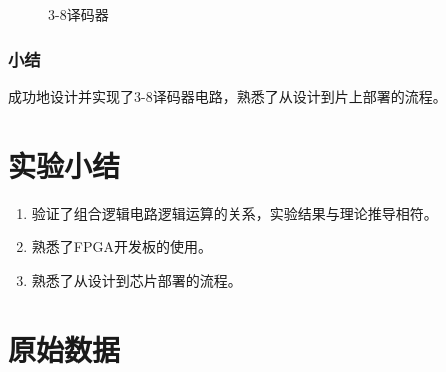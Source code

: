 \documentclass[UTF8]{ctexart}
\numberwithin{figure}{subsection}
\numberwithin{table}{subsection}
\numberwithin{equation}{subsection}
\begin{document}
\begin{figure}[H]
    
    \caption{3-8译码器}
    \label{38dec}
\end{figure}

\subsubsection{小结}
\par 成功地设计并实现了3-8译码器电路，熟悉了从设计到片上部署的流程。


\section{实验小结}
\begin{enumerate}
    \item 验证了组合逻辑电路逻辑运算的关系，实验结果与理论推导相符。
    \item 熟悉了FPGA开发板的使用。
    \item 熟悉了从设计到芯片部署的流程。
\end{enumerate}


\section*{原始数据}
\end{document}
